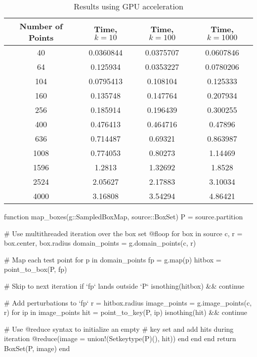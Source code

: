 \begin{table}[ht!]
    \centering
    {\footnotesize
        \begin{tabular}{| c | c c c |}
            \hline
            Number of Points & Time, $k=10$ & Time, $k=100$ & Time, $k=1000$ \\
            \hline
            40  &  0.0360844   &  0.0375707    &  0.0607846 \\
            64  &  0.125934    &  0.0353227    &  0.0780206 \\
            104  &  0.0795413   &  0.108104     &  0.125333 \\
            160  &  0.135748    &  0.147764     &  0.207934 \\
            256  &  0.185914    &  0.196439     &  0.300255 \\
            400  &  0.476413    &  0.464716     &  0.47896 \\
            636  &  0.714487    &  0.69321      &  0.863987 \\ 
            1008  &  0.774053    &  0.80273      &  1.14469 \\ 
            1596  &  1.2813      &  1.32692      &  1.8528 \\
            2524  &  2.05627     &  2.17883      &  3.10034 \\
            4000  &  3.16808     &  3.54294      &  4.86421 \\
            \hline
        \end{tabular}
    }
    \caption{Results using GPU acceleration}
    \label{tb:gpu}
\end{table}

\clearpage

\begin{jllisting}[float, floatplacement=hb!, language=julia, style=jlcodestyle, label=lst:boxmap, captionpos=b, caption=Function to calculate $f(\mathcal{B})$]
    function map_boxes(g::SampledBoxMap, source::BoxSet)
        P = source.partition

        # Use multithreaded iteration over the box set
        @floop for box in source
            c, r = box.center, box.radius
            domain_points = g.domain_points(c, r)
            
            # Map each test point
            for p in domain_points
                fp = g.map(p)
                hitbox = point_to_box(P, fp)

                # Skip to next iteration if `fp` lands outside `P`
                isnothing(hitbox) && continue

                # Add perturbations to `fp`
                r = hitbox.radius
                image_points = g.image_points(c, r)
                for ip in image_points
                    hit = point_to_key(P, ip)
                    isnothing(hit) && continue
                    
                    # Use @reduce syntax to initialize an empty
                    # key set and add hits during iteration
                    @reduce(image = union!(Set{keytype(P)}(), hit))
                end
            end
        end
        return BoxSet(P, image)
    end 
\end{jllisting}

